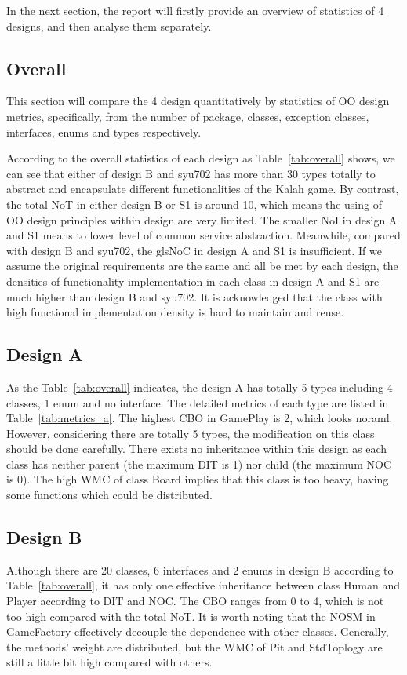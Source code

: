 \documentclass[conference]{IEEEtran}
\begin{document}
	In the next section, the report will firstly provide an overview of statistics of 4 designs, and then analyse them separately.
	
	\subsection{Overall}
	This section will compare the 4 design quantitatively by statistics of \gls{OO} design metrics, specifically, from the number of package, classes, exception classes, interfaces, enums and types respectively. 
	
	
	According to the overall statistics of each design as Table~\ref{tab:overall} shows, we can see that  either of design B and syu702 has more than 30 types totally to abstract and encapsulate different functionalities of the Kalah game. By contrast, the total \gls{NoT} in either design B or S1 is around 10, which means the using of \gls{OO} design principles within design are very limited. The smaller \gls{NoI} in design A and S1 means to lower level of common service abstraction. Meanwhile, compared with design B and syu702, the gls{NoC} in design A and S1 is insufficient. If we assume the original requirements are the same and all be met by each design, the densities of functionality implementation in each class in design A and S1 are much higher than design B and syu702. It is acknowledged that the class with high functional implementation density is hard to maintain and reuse. 
	
	\subsection{Design A}		
	
	As the Table~\ref{tab:overall} indicates, the design A has totally 5 types including 4 classes, 1 enum and no interface. The detailed metrics of each type are listed in Table~\ref{tab:metrics_a}. The highest \gls{CBO} in GamePlay is 2, which looks noraml. However, considering there are totally 5 types, the modification on this class should be done carefully. There exists no inheritance within this design as each class has neither parent (the maximum \gls{DIT} is 1) nor child (the maximum \gls{NOC} is 0). The high \gls{WMC} of class Board implies that this class is too heavy, having some functions which could be distributed.
	
	\subsection{Design B}
	
	Although there are 20 classes, 6 interfaces and 2 enums in design B according to Table~\ref{tab:overall}, it has only one effective inheritance between class Human and Player according to \gls{DIT} and \gls{NOC}. The \gls{CBO} ranges from 0 to 4, which is not too high compared with the total \gls{NoT}. It is worth noting that the \gls{NOSM} in GameFactory effectively decouple the dependence with other classes.  Generally, the methods' weight are distributed, but the \gls{WMC} of Pit and StdToplogy are still a little bit high compared with others. 
	
\end{document}
